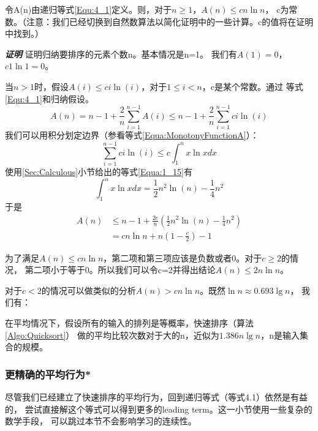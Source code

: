 \begin{theorem}
令A(n)由递归等式\ref{Equ:4_1}定义。则，对于$n \geq 1$，$A(n)\leq cn\ln n$，
c为常数。（注意：我们已经切换到自然数算法以简化证明中的一些计算。c的值将在证明中找到。）

{\textbf{\emph{证明}}}  证明归纳要排序的元素个数n。基本情况是n=1。
我们有$A(1)=0$，$c1\ln1=0$。

当$n>1$时，假设$A(i) \leq ci\ln(i)$，对于$1\leq i<n$，c是某个常数。通过
等式\ref{Equ:4_1}和归纳假设。
\begin{displaymath}
A(n)=n-1+\frac{2}{n}\sum_{i=1}^{n-1}A(i)\leq n-1+\frac{2}{n}\sum_{i=1}^{n-1}ci\ln(i)
\end{displaymath}
我们可以用积分划定边界（参看等式\ref{Equa:MonotonyFunctionA}）：
\begin{displaymath}
\sum_{i=1}^{n-1}ci\ln(i)\leq c\int_1^nx\ln x dx
\end{displaymath}
使用\ref{Sec:Calculous}小节给出的等式\ref{Equa:1_15}有
\begin{displaymath}
\int_1^nx\ln x dx =\frac{1}{2}n^2\ln(n)-\frac{1}{4}n^2
\end{displaymath}
于是
\begin{displaymath}
\begin{aligned}
A(n)&\leq n-1 +\frac{2c}{n}\left(\frac{1}{2}n^2\ln(n)-\frac{1}{4}n^2\right)\\
&=cn\ln n+n(1-\frac{c}{2})-1
\end{aligned}
\end{displaymath}

为了满足$A(n)\leq cn\ln n$，第二项和第三项应该是负数或者0。对于$c\geq 2$的情况，
第二项小于等于0。所以我们可以令c=2并得出结论$A(n)\leq 2n\ln n$。
\end{theorem}

对于$c<2$的情况可以做类似的分析$A(n)>cn\ln n$。既然$\ln n\approx 0.693\lg n$，
我们有：

\begin{corollary}
在平均情况下，假设所有的输入的排列是等概率，快速排序（算法\ref{Algo:Quicksort}）
做的平均比较次数对于大的n，近似为$1.386n\lg n$，n是输入集合的规模。
\end{corollary}

\subsubsection{更精确的平均行为*}
尽管我们已经建立了快速排序的平均行为，回到递归等式（等式4.1）依然是有益的，
尝试直接解这个等式可以得到更多的leading term。这一小节使用一些复杂的数学手段，
可以跳过本节不会影响学习的连续性。

